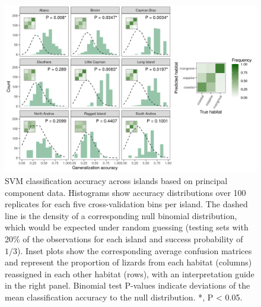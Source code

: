 \begin{figure}[H]
    \centering
	\includegraphics[width=\textwidth]{"../analyses/04-machine learning/plots/classif_svm_pca"}
	\caption{SVM classification accuracy across islands based on principal component data. Histograms show accuracy distributions over 100 replicates for each five cross-validation bins per island. The dashed line is the density of a corresponding null binomial distribution, which would be expected under random guessing (testing sets with 20\% of the observations for each island and success probability of $1/3$). Inset plots show the corresponding average confusion matrices and represent the proportion of lizards from each habitat (columns) reassigned in each other habitat (rows), with an interpretation guide in the right panel. Binomial test P-values indicate deviations of the mean classification accuracy to the null distribution. *, P < 0.05.}
	\label{fig:classif-svm-pca}
\end{figure}
